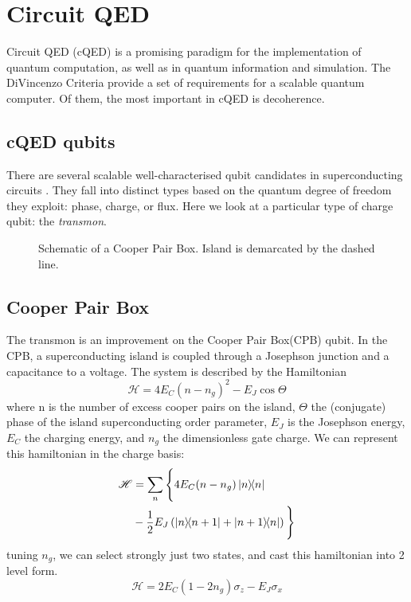 \section{Circuit QED}
Circuit QED (cQED) is a promising paradigm for the implementation of quantum computation, as well as in quantum information and simulation.
The DiVincenzo Criteria \cite{DiVincenzo} provide a set of requirements for a scalable quantum computer. 
Of them, the most important in cQED is decoherence. 
\subsection{cQED qubits}
There are several scalable well-characterised qubit candidates in superconducting circuits \cite{Makhlin2001}.
They fall into distinct types based on the quantum degree of freedom they exploit: phase, charge, or flux.
Here we look at a particular type of charge qubit: the \emph{transmon}.
\begin{figure}[!htb]
  \centering
  \resizebox{.83\linewidth}{!}{}
  \caption{Schematic of a Cooper Pair Box. Island is demarcated by the dashed line.}
  \label{cooperpairbox}
\end{figure}
\subsection{Cooper Pair Box}
The transmon is an improvement on the Cooper Pair Box(CPB) qubit.
In the CPB, a superconducting island is coupled through a Josephson junction and a capacitance to a voltage.
The system is described by the Hamiltonian \cite{Makhlin2001}
\begin{equation}
  \mathscr{H} = 4E_C(n-n_g)^2 - E_J \cos \Theta
\end{equation}
where n is the number of excess cooper pairs on the island, $\Theta$ the (conjugate) phase of the island superconducting order parameter, $E_J$ is the Josephson energy, $E_C$ the charging energy, and $n_g$ the dimensionless gate charge.
We can represent this hamiltonian in the charge basis:
\begin{align}
  \mathscr{H} &= \sum_n \Bigg\{ 4 E_C (n-n_g) \ketbra{n}{n}\\ 
              &- \frac{1}{2} E_J \left( \ketbra{n}{n+1} 
                                       + \ketbra{n+1}{n} \right) \Bigg\}
\end{align}
tuning $n_g$, we can select strongly just two states, and cast this hamiltonian into 2 level form.
\begin{equation}
  \mathscr{H} = 2E_C ( 1-2n_g ) \sigma_z - E_J \sigma_x 
\end{equation}
